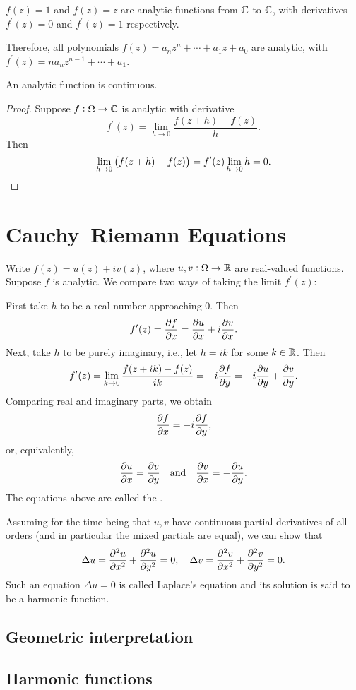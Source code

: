 \begin{example}
$f(z)=1$ and $f(z)=z$ are analytic functions from $\mathbb C$ to $\mathbb C$, with derivatives $f^\prime(z)=0$ and $f^\prime(z)=1$ respectively.

Therefore, all polynomials $f(z)=a_nz^n+\cdots+a_1z+a_0$ are analytic, with $f^\prime(z)=na_nz^{n-1}+\cdots+a_1$.
\end{example}

\begin{proposition}
An analytic function is continuous.
\end{proposition}

\begin{proof}
Suppose $f:\Omega\to\mathbb C$ is analytic with derivative 
\[f^\prime(z)=\lim_{h\to0}\frac{f(z+h)-f(z)}{h}.\]
Then
\[\lim_{h\to0}\left(f(z+h)-f(z)\right)=f^\prime(z)\lim_{h\to0}h=0.\]
\end{proof}

\section{Cauchy--Riemann Equations}
Write $f(z)=u(z)+iv(z)$, where $u,v:\Omega\to\mathbb R$ are real-valued functions. Suppose $f$ is analytic. We compare two ways of taking the limit $f^\prime(z)$:

First take $h$ to be a real number approaching $0$. Then
\[f^\prime(z)=\pdv{f}{x}=\pdv{u}{x}+i\pdv{v}{x}.\]
Next, take $h$ to be purely imaginary, i.e., let $h=ik$ for some $k\in\mathbb R$. Then
\[f^\prime(z)=\lim_{k\to0}\frac{f(z+ik)-f(z)}{ik}=-i\pdv{f}{y}=-i\pdv{u}{y}+\pdv{v}{y}.\]
Comparing real and imaginary parts, we obtain
\[\pdv{f}{x}=-i\pdv{f}{y},\]
or, equivalently,
\[\pdv{u}{x}=\pdv{v}{y}\quad\text{and}\quad\pdv{v}{x}=-\pdv{u}{y}.\]
The equations above are called the .

Assuming for the time being that $u,v$ have continuous partial derivatives of all orders (and in particular the mixed partials are equal), we can show that
\[\Delta u=\pdv[2]{u}{x}+\pdv[2]{u}{y}=0,\quad\Delta v=\pdv[2]{v}{x}+\pdv[2]{v}{y}=0.\]
Such an equation $\Delta u=0$ is called Laplace's equation and its solution is said to be a harmonic function.
\subsection{Geometric interpretation}


\subsection{Harmonic functions}

